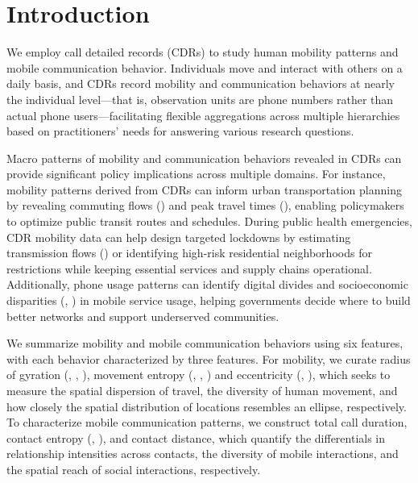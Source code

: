 \chapter{Introduction}
We employ call detailed records (CDRs) to study human mobility patterns and mobile communication behavior.
Individuals move and interact with others on a daily basis, and CDRs record mobility and communication behaviors at nearly the individual level---that is, observation units are phone numbers rather than actual phone users---facilitating flexible aggregations across multiple hierarchies based on practitioners' needs for answering various research questions.

Macro patterns of mobility and communication behaviors revealed in CDRs can provide significant policy implications across multiple domains.
For instance, mobility patterns derived from CDRs can inform urban transportation planning by revealing commuting flows (\cite{phithakkitnukoon2012socio}) and peak travel times (\cite{tongsinoot2017exploring}), enabling policymakers to optimize public transit routes and schedules.
During public health emergencies, CDR mobility data can help design targeted lockdowns by estimating transmission flows (\cite{wesolowski2016connecting}) or identifying high-risk  residential neighborhoods for restrictions while keeping essential services and supply chains operational.
Additionally, phone usage patterns can identify digital divides and socioeconomic disparities (\cite{onnela2007structure}, \cite{blumenstock2015predicting}) in mobile service usage, helping governments decide where to build better networks and support underserved communities.

We summarize mobility and mobile communication behaviors using six features, with each behavior characterized by three features.
For mobility, we curate radius of gyration (\cite{gonzalez2008understanding}, \cite{ranjan2012call}, \cite{pappalardo2015returners}), movement entropy (\cite{eagle2010network}, \cite{song2010limits}, \cite{pappalardo2016analytical}) and eccentricity (\cite{yuan2012correlating}, \cite{zhao2019effect}), which seeks to measure the spatial dispersion of travel, the diversity of human movement, and how closely the spatial distribution of locations resembles an ellipse, respectively.
To characterize mobile communication patterns, we construct total call duration, contact entropy (\cite{eagle2010network}, \cite{pappalardo2016analytical}), and contact distance, which quantify the differentials in relationship intensities across contacts, the diversity of mobile interactions, and the spatial reach of social interactions, respectively.


